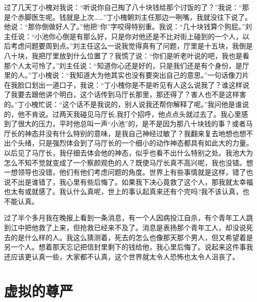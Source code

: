 \documentclass[12pt,oneside]{book}
\begin{document}
过了几天丁小槐对我说：``听说你自己掏了八十块钱给那个讨饭的了？''我说：``那是个赤脚医生呢。钱就是上次\ldots\ldots{}''丁小槐朝刘主任那边一咧嘴，我就没往下说了。他说：``那你倒做好人了。''他把``你''字咬得特别重。我说：``几十块钱算个狗屁。''刘主任说：``小池你心倒是有那么好，只是你对他还是不比对街上碰到的一个人，以后考虑问题要周到点。''刘主任这么一说我觉得真有了问题，厅里是十五块，我倒是八十块，我把厅里放到什么位置了？我慌了说：``你们是听老叶说的吧，我也是看那个人太可怜了。''刘主任说：``知道你心还是好的，只是我们还是有个身份，是厅里的人。''丁小槐说：``我知道大为他其实也没有要突出自己的意思。''一句话像刀片在我脸口划出一道口子，我说：``丁小槐你是不是听见有人这么说我了？谁这样说了我要去跟他讲个明白，这个话传到马厅长那里，那还得了？害人也不是这样害的。''丁小槐忙说：``这个话不是我说的，别人说我还帮你解释了呢。''我问他是谁说的，他不肯说。过两天我碰见马厅长,我打个招呼，他点点头就过去了。我心里感到了很大的压力，平时他总叫一声``小池''的，是不是因为那八十块钱的事？或者马厅长的神态并没有什么特别的意味，是我自己神经过敏了？我翻来复去地想也想不出个头绪，只是强烈体会到了马厅长的一个细小的动作神态都具有如此大的力量。以后见了马厅长，我仔细去体会他的神态，似乎也看不出什么特别之处。我池大为怎么不知不觉就变成了一个察颜观色的人？既使马厅长真不高兴呢，我也没错。想一想领导也没错，他们有他们考虑问题的角度。世界上有些事情就是这样，错了也说不出是谁错了，我心里有些后悔了。如果我下决心竟救了这个人，那我就太幸福也太有或就感了。我认什么真呢，世上的事认起真来还有个完吗?我不该认真，也不能认真。

过了半个多月我在晚报上看到一条消息，有一个人因病投江自杀，有个青年工人跳到江中把他救了上来，但抢救已经来不及了。消息是表扬那个青年工人，却没说死去的是什么样的人。我这么猜测着，死去的怎么也像那天那个男人，但又希望着是另一个人。想着那天忘记把信封里剩下的钱给他，我心里后悔了。说起来这件事我还应该更认真一些，大家都不认真，这个世界就太令人恐怖也太令人沮丧了。


\chapter{虚拟的尊严}
\end{document}
